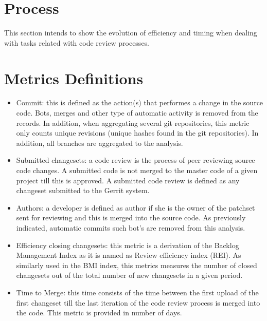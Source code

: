 \documentclass[a4wide,11pt]{article}
\begin{document}
\begin{CJK}{UTF8}{bsmi}



\section{Process} \label{process}
This section intends to show the evolution of efficiency and timing when dealing with tasks related with code review processes.\\
	


\appendix{}

\section{Metrics Definitions} \label{metrics}
\label{chap:metrics_definitions}

\begin{itemize}
\item Commit: this is defined as the action(s) that performes a change in the source code. Bots, merges and other type of automatic activity is removed from the records. In addition, when aggregating several git repositories, this metric only counts unique revisions (unique hashes found in the git repositories). In addition, all branches are aggregated to the analysis.

\item Submitted changesets: a code review is the process of peer reviewing source code changes. A submitted code is not merged to the master code of a given project till this is approved. A submitted code review is defined as any changeset submitted to the Gerrit
system. 
 
\item Authors: a developer is defined as author if she is the owner of the patchset sent for reviewing and this is merged into the source code. As previously indicated, automatic commits such bot's are removed from this analysis.

\item Efficiency closing changesets: this metric is a derivation of the Backlog Management Index as it is named as Review efficiency index (REI). As similarly used in the BMI index, this metrics measures the number of closed changesets
 out of the total number of new changesets in a given period.

\item Time to Merge: this time consists of the time between the first upload of the first changeset till the last iteration of the code review process is merged into the code. This metric is provided in number of days.


\end{itemize}
\end{CJK}
\end{document}
